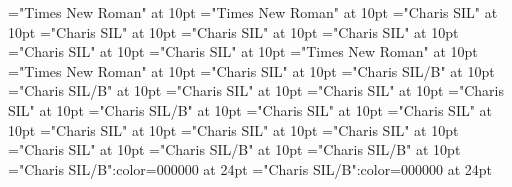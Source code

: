 \documentclass[a4paper,twoside]{article}
\begin{document}
\font\xitempttranslationLcpttranslationsexamplessensesensesentryletDatadicBody="Times New Roman" at 10pt
\font\spanptxitempttranslationLcpttranslationsexamplessensesensesentryletDatadicBody="Times New Roman" at 10pt
\font\spanentranslationLcpttranslationsexamplessensesensesentryletDatadicBody="Charis SIL" at 10pt
\font\xitementranslationLcpttranslationsexamplessensesensesentryletDatadicBody="Charis SIL" at 10pt
\font\spanenxitementranslationLcpttranslationsexamplessensesensesentryletDatadicBody="Charis SIL" at 10pt
\font\complexformrefsentryletDatadicBody="Charis SIL" at 10pt
\font\complexformrefsafterentryletDatadicBody="Charis SIL" at 10pt
\font\complexformtypecomplexformrefsentryletDatadicBody="Charis SIL" at 10pt
\font\LexEntryTypepublishStemComplexFormTypeReverseAbbrPubptcomplexformtypecomplexformrefsentryletDatadicBody="Times New Roman" at 10pt
\font\spanptLexEntryTypepublishStemComplexFormTypeReverseAbbrPubptcomplexformtypecomplexformrefsentryletDatadicBody="Times New Roman" at 10pt
\font\spanencomplexformtypecomplexformrefsentryletDatadicBody="Charis SIL" at 10pt
\font\complexformformsehcomplexformrefsentryletDatadicBody="Charis SIL/B" at 10pt
\font\spanencomplexformformsehcomplexformrefsentryletDatadicBody="Charis SIL/B" at 10pt
\font\spanencomplexformrefsentryletDatadicBody="Charis SIL" at 10pt
\font\xitementryrefcomponentprimaryrefsentryletDatadicBody="Charis SIL" at 10pt
\font\axitementryrefcomponentprimaryrefsentryletDatadicBody="Charis SIL" at 10pt
\font\LexEntrypublishStemComponentTargetHeadWordRefsehaxitementryrefcomponentprimaryrefsentryletDatadicBody="Charis SIL/B" at 10pt
\font\spanenentryrefcomponentprimaryrefsentryletDatadicBody="Charis SIL" at 10pt
\font\translationLcentranslationsexamplessensesensesentryletDatadicBody="Charis SIL" at 10pt
\font\spanentranslationLcentranslationsexamplessensesensesentryletDatadicBody="Charis SIL" at 10pt
\font\xitemrelationssensesensesentryletDatadicBody="Charis SIL" at 10pt
\font\lexreftargetsxitemrelationssensesensesentryletDatadicBody="Charis SIL" at 10pt
\font\alexreftargetsxitemrelationssensesensesentryletDatadicBody="Charis SIL" at 10pt
\font\sensecrossrefsehalexreftargetsxitemrelationssensesensesentryletDatadicBody="Charis SIL/B" at 10pt
\font\xsensexrefnumbersensecrossrefsehalexreftargetsxitemrelationssensesensesentryletDatadicBody="Charis SIL/B" at 10pt
\color{black} 
\thispagestyle{empty} 
\font\CoverPageTitle="Charis SIL/B":color=000000 at 24pt 
\font\pFrontMatterdiv="Charis SIL/B":color=000000 at 24pt 
\end{document}
